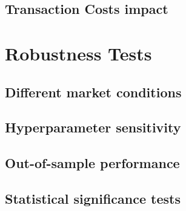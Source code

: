 \subsection{Transaction Costs impact}


\section{Robustness Tests}

\subsection{Different market conditions}

\subsection{Hyperparameter sensitivity}

\subsection{Out-of-sample performance}

\subsection{Statistical significance tests}


